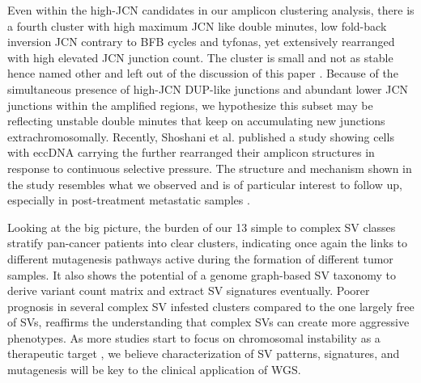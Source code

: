 \documentclass[phd,tocprelim]{cornell}
\begin{document}
Even within the high-JCN candidates in our amplicon clustering analysis, there is a fourth cluster with high maximum JCN like double minutes, low fold-back inversion JCN contrary to BFB cycles and tyfonas, yet extensively rearranged with high elevated JCN junction count. The cluster is small and not as stable hence named other and left out of the discussion of this paper \cite{Hadi2020-um}. Because of the simultaneous presence of high-JCN DUP-like junctions and abundant lower JCN junctions within the amplified regions, we hypothesize this subset may be reflecting unstable double minutes that keep on accumulating new junctions extrachromosomally. Recently, Shoshani et al. published a study showing cells with eccDNA carrying the  further rearranged their amplicon structures in response to continuous selective pressure. The structure and mechanism shown in the study resembles what we observed and is of particular interest to follow up, especially in post-treatment metastatic samples \cite{Priestley:20196a6}.

Looking at the big picture, the burden of our 13 simple to complex SV classes stratify pan-cancer patients into clear clusters, indicating once again the links to different mutagenesis pathways active during the formation of different tumor samples. It also shows the potential of a genome graph-based SV taxonomy to derive variant count matrix and extract SV signatures eventually. Poorer prognosis in several complex SV infested clusters compared to the one largely free of SVs, reaffirms the understanding that complex SVs can create more aggressive phenotypes. As more studies start to focus on chromosomal instability as a therapeutic target \cite{Bielski2021-ue}, we believe characterization of SV patterns, signatures, and mutagenesis will be key to the clinical application of WGS.

\end{document}
